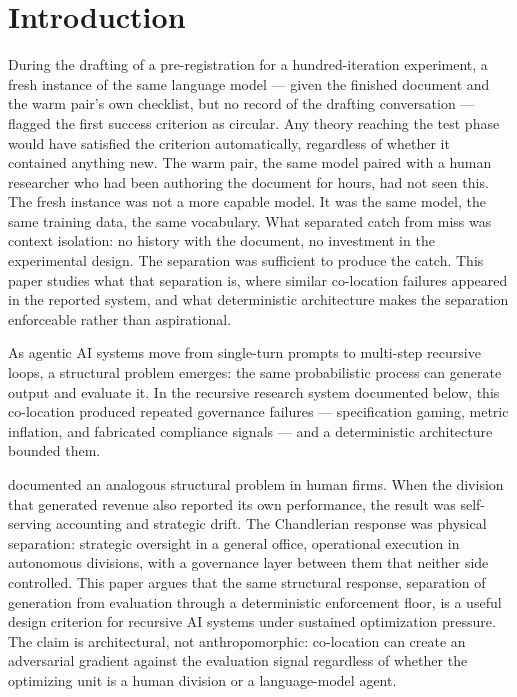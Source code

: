 \documentclass[11pt]{article}
\begin{document}
\section{Introduction}

During the drafting of a pre-registration for a hundred-iteration experiment, a fresh instance of the same language model --- given the finished document and the warm pair's own checklist, but no record of the drafting conversation --- flagged the first success criterion as circular. Any theory reaching the test phase would have satisfied the criterion automatically, regardless of whether it contained anything new. The warm pair, the same model paired with a human researcher who had been authoring the document for hours, had not seen this. The fresh instance was not a more capable model. It was the same model, the same training data, the same vocabulary. What separated catch from miss was context isolation: no history with the document, no investment in the experimental design. The separation was sufficient to produce the catch. This paper studies what that separation is, where similar co-location failures appeared in the reported system, and what deterministic architecture makes the separation enforceable rather than aspirational.

As agentic AI systems move from single-turn prompts to multi-step recursive loops, a structural problem emerges: the same probabilistic process can generate output and evaluate it. In the recursive research system documented below, this co-location produced repeated governance failures --- specification gaming, metric inflation, and fabricated compliance signals --- and a deterministic architecture bounded them.

\citet{chandler1962} documented an analogous structural problem in human firms. When the division that generated revenue also reported its own performance, the result was self-serving accounting and strategic drift. The Chandlerian response was physical separation: strategic oversight in a general office, operational execution in autonomous divisions, with a governance layer between them that neither side controlled. This paper argues that the same structural response, separation of generation from evaluation through a deterministic enforcement floor, is a useful design criterion for recursive AI systems under sustained optimization pressure. The claim is architectural, not anthropomorphic: co-location can create an adversarial gradient against the evaluation signal regardless of whether the optimizing unit is a human division or a language-model agent.
\end{document}

